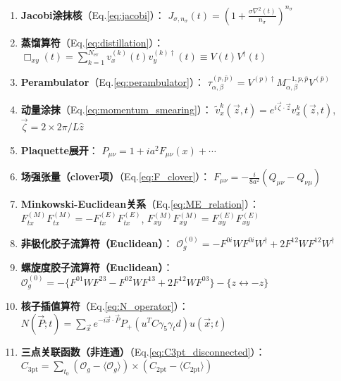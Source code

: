 \documentclass[11pt,a4paper]{article}
\begin{document}
\begin{enumerate}[label=(\arabic*), leftmargin=*]
    \item \textbf{Jacobi涂抹核}（Eq.\ref{eq:jacobi}）：
    $J_{\sigma, n_\sigma}(t) = (1 + \frac{\sigma \nabla^2(t)}{n_\sigma})^{n_\sigma}$

    \item \textbf{蒸馏算符}（Eq.\ref{eq:distillation}）：
    $\Box_{xy}(t) = \sum_{k=1}^{N_{\text{ev}}} v^{(k)}_x(t) v^{(k)\dagger}_y(t) \equiv V(t) V^\dagger(t)$

    \item \textbf{Perambulator}（Eq.\ref{eq:perambulator}）：
    $\tau^{(p,\bar{p})}_{\alpha,\beta} = V^{(p)\dagger} M^{-1,p,\bar{p}}_{\alpha,\beta} V^{(\bar{p})}$

    \item \textbf{动量涂抹}（Eq.\ref{eq:momentum_smearing}）：
    $\tilde{v}^k_x(\vec{z},t) = e^{i\vec{\zeta}\cdot\vec{z}} v^k_x(\vec{z},t)$, $\vec{\zeta} = 2 \times 2\pi/L \hat{z}$

    \item \textbf{Plaquette展开}：
    $P_{\mu\nu} = 1 + i a^2 F_{\mu\nu}(x) + \cdots$

    \item \textbf{场强张量（clover项）}（Eq.\ref{eq:F_clover}）：
    $F_{\mu\nu} = -\frac{i}{8a^2} (Q_{\mu\nu} - Q_{\nu\mu})$

    \item \textbf{Minkowski-Euclidean关系}（Eq.\ref{eq:ME_relation}）：
    $F^{(M)}_{tx} F^{(M)}_{tx} = -F^{(E)}_{tx} F^{(E)}_{tx}$, $F^{(M)}_{xy} F^{(M)}_{xy} = F^{(E)}_{xy} F^{(E)}_{xy}$

    \item \textbf{非极化胶子流算符（Euclidean）}：
    $\mathcal{O}^{(0)}_g = -F^{0i} W F^{0i} W^\dagger + 2F^{12} W F^{12} W^\dagger$

    \item \textbf{螺旋度胶子流算符（Euclidean）}：
    $\mathcal{O}^{(0)}_g = -\{F^{01} W F^{23} - F^{02} W F^{13} + 2F^{12} W F^{03}\} - \{z \leftrightarrow -z\}$

    \item \textbf{核子插值算符}（Eq.\ref{eq:N_operator}）：
    $N(\vec{P}; t) = \sum_{\vec{x}} e^{-i\vec{x}\cdot\vec{P}} P_+ (u^T C \gamma_5 \gamma_t d) u(\vec{x}; t)$

    \item \textbf{三点关联函数（非连通）}（Eq.\ref{eq:C3pt_disconnected}）：
    $C_{3\text{pt}} = \sum_{t_0} (\mathcal{O}_g - \langle \mathcal{O}_g \rangle) \times (C_{2\text{pt}} - \langle C_{2\text{pt}} \rangle)$


\end{enumerate}
\end{document}
